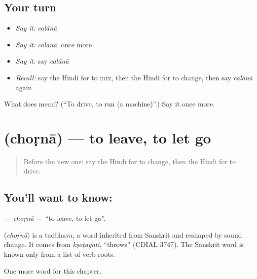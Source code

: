 \subsection*{Your turn}
\begin{itemize}
\raggedright
  \item \emph{Say it:} \emph{calānā}
  \item \emph{Say it:} \emph{calānā}, once more
  \item \emph{Say it:} say \emph{calānā}
  \item \emph{Recall:} say the Hindi for to mix, then the Hindi for to change, then say \emph{calānā} again
\end{itemize}

\begin{tcolorbox}[breakable,colback=teal!4,colframe=teal!35!black,title={Before you move on}]
What does  mean? (\textquotedblleft{}To drive, to run (a machine)\textquotedblright{}.) Say it once more.
\end{tcolorbox}
\section[\texorpdfstring{\hi{छोड़ना} (choṛnā)}{छोड़ना (choṛnā)}]{ (choṛnā) — to leave, to let go}

\label{lesson:HI-C168-chorna}



\begin{quote}
Before the new one: say the Hindi for to change, then the Hindi for to drive.
\end{quote}

\subsection*{You'll want to know: }
\textbf{} — \emph{choṛnā} — \textquotedblleft{}to leave, to let go\textquotedblright{}.

\begin{cousinweb}
\textbf{} (\emph{choṛnā}) is a tadbhava, a word inherited from Sanskrit and reshaped by sound change. It comes from \emph{kṣoṭayati}, \textquotedblleft{}throws\textquotedblright{} (CDIAL 3747). The Sanskrit word is known only from a list of verb roots.
\end{cousinweb}

\begin{grammarlens}[title={What you've built}]
One more word for this chapter.
\end{grammarlens}

